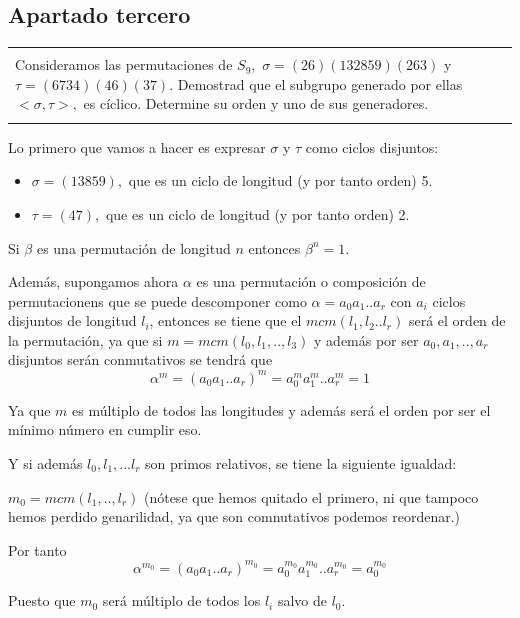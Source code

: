 \documentclass[12pt]{article}
\newenvironment{micaja}
{
    \begin{center}
    \begin{tabular}{|p{0.9\textwidth}|}
    \hline\\
    }   
    {   
    \\\\\hline
    \end{tabular} 
    \end{center}
    }
\begin{document}
\subsection{Apartado tercero}

\begin{micaja}
    Consideramos las permutaciones de $S_9,$
    $\sigma = (2 6)(132859)(263)$ y $\tau = (6734)(46)(37).$
    Demostrad que el subgrupo generado por ellas $<\sigma, \tau>,$ es cíclico. 
    Determine su orden y uno de sus generadores. 
\end{micaja}

Lo primero que vamos a hacer es expresar $\sigma$ y $\tau$ como ciclos disjuntos: 
\begin{itemize}
    \item $\sigma = (13859),$ que es un ciclo de longitud (y por tanto orden) 5.
    \item $\tau = (4 7),$ que es un ciclo de longitud (y por tanto orden) 2.
\end{itemize}

Si $\beta$ es una permutación
de longitud $n$ entonces $\beta^n = 1.$

Además, supongamos ahora  $\alpha$  es una permutación o composición de
permutacionens que se puede descomponer como $\alpha = a_0 a_1 ..a_r$ con $a_i$ ciclos 
disjuntos de longitud $l_i$, entonces se tiene que el $mcm(l_1,l_2..l_r)$ será el orden de la permutación,
ya que si $m = mcm(l_0, l_1,..,l_3)$  y además por ser $a_0, a_1,..,a_r$ disjuntos serán conmutativos
  se tendrá que 
$$\alpha ^m = (a_0 a_1 ..a_r)^m = a_0^m a_1^m..a_r^m = 1$$

Ya que $m$ es múltiplo de todos las longitudes y además será el orden por ser el mínimo 
número en cumplir eso. 

Y si además $l_0,l_1,...l_r$ son primos relativos, se tiene la siguiente
igualdad: 

$m_0 = mcm(l_1,..,l_r)$ (nótese que hemos quitado el primero, ni que tampoco hemos perdido
genarilidad, ya que son comnutativos podemos reordenar.)

Por tanto 
\begin{equation}
    \alpha^{m_0} = (a_0 a_1 ..a_r)^{m_0} = a_0^{m_0} a_1^{m_0}..a_r^{m_0} = a_0^{m_0}
\end{equation}



Puesto que $m_0$ será múltiplo de todos los $l_i$ salvo de $l_0.$ \paragraph{}
\end{document}
